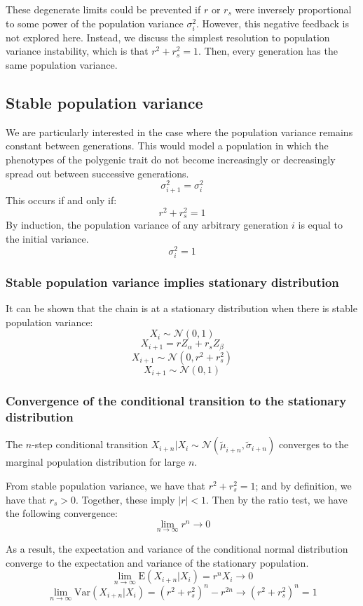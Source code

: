 \documentclass[a4paper,11pt]{article}
\begin{document}
These degenerate limits could be prevented if $r$ or $r_s$ were inversely proportional to some power of the population variance $\sigma_i^2$. However, this negative feedback is not explored here. Instead, we discuss the simplest resolution to population variance instability, which is that $r^2+r_s^2 = 1$. Then, every generation has the same population variance.

\subsection{Stable population variance}
We are particularly interested in the case where the population variance remains constant between generations. This would model a population in which the phenotypes of the polygenic trait do not become increasingly or decreasingly spread out between successive generations. 
$$\sigma_{i+1}^2 = \sigma_i^2$$
This occurs if and only if:
$$r^2+r_s^2 = 1$$
%
By induction, the population variance of any arbitrary generation $i$ is equal to the initial variance. 
$$\sigma_i^2 = 1$$

\subsubsection{Stable population variance implies stationary distribution}
It can be shown that the chain is at a stationary distribution when there is stable population variance:
$$X_i \sim \mathcal{N}(0, 1)$$
$$X_{i+1} = r Z_\alpha + r_s Z_\beta$$
$$X_{i+1} \sim \mathcal{N}(0, r^2+r_s^2)$$
$$X_{i+1} \sim \mathcal{N}(0, 1)$$

\subsubsection{Convergence of the conditional transition to the stationary distribution}
The $n$-step conditional transition $X_{i+n}|X_i \sim \mathcal{N}( \tilde{\mu}_{i+n}, \tilde{\sigma}_{i+n})$ converges to the marginal population distribution for large $n$. 

From stable population variance, we have that $r^2 + r_s^2 = 1$; and by definition, we have that $r_s > 0$. Together, these imply $|r| < 1$. Then by the ratio test, we have the following convergence:
$$\lim_{n\to\infty} r^n \rightarrow 0$$

As a result, the expectation and variance of the conditional normal distribution converge to the expectation and variance of the stationary population.
$$\lim_{n\to\infty} \mathrm{E}(X_{i+n}|X_i) = r^nX_i \rightarrow 0$$
$$\lim_{n\to\infty} \mathrm{Var}(X_{i+n}|X_i) = (r^2+r_s^2)^n-r^{2n} \rightarrow (r^2+r_s^2)^n = 1$$
\end{document}
